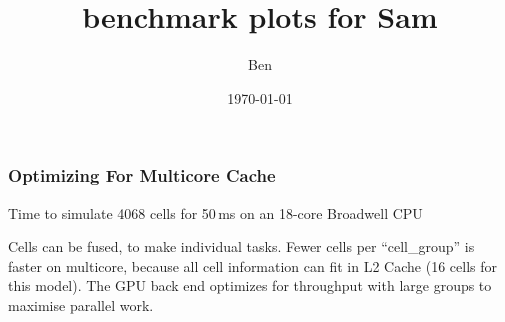 \documentclass[aspectratio=43,12pt]{beamer}
\author{Ben}
\title{benchmark plots for Sam}
\date{\today}
\begin{document}
\cscstitle

\begin{frame}
    \frametitle{Optimizing For Multicore Cache}

    \begin{center}
    {\small Time to simulate 4068 cells for 50\,ms on an 18-core Broadwell CPU}
    \end{center}
        \vfill

    Cells can be fused, to make individual tasks.
    Fewer cells per ``cell\_group'' is faster on multicore, because all cell information can fit in L2 Cache (16 cells for this model).
    The GPU back end optimizes for throughput with large groups to maximise parallel work.
\end{frame}
\end{document}
